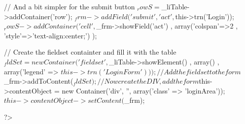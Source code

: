 \begin{DoxyCodeInclude}
{{                // And a bit simpler for the submit button
                $_rowS = $_liTable->addContainer('row');
                $_frm->addField('submit', 'act', $this->trn('Login'));
                $_rowS->addContainer(
                          'cell'
                        , $_frm->showField('act')
                        , array('colspan'=>2
                        , 'style'=>'text-align:center;')
                );

                // Create the fieldset containter and fill it with the table
                $_fldSet = new Container(
                          'fieldset'
                        , $_liTable->showElement()
                        , array()
                        , array('legend' => $this->trn('Login Form'))
                );

                // Add the fieldset to the form
                $_frm->addToContent($_fldSet);

                // Now create the DIV, add the form
                $this->contentObject = new Container('div', '', array('class' => 
      'loginArea'));
                $this->contentObject->setContent($_frm);
        }
}
?>
\end{DoxyCodeInclude}
 